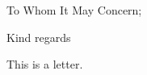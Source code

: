 \documentclass[11pt,a4paper,roman]{moderncv}
\begin{document}
\date{\today}
\opening{To Whom It May Concern;}
\closing{Kind regards}

\makelettertitle

This is a letter.

\makeletterclosing
\end{document}
